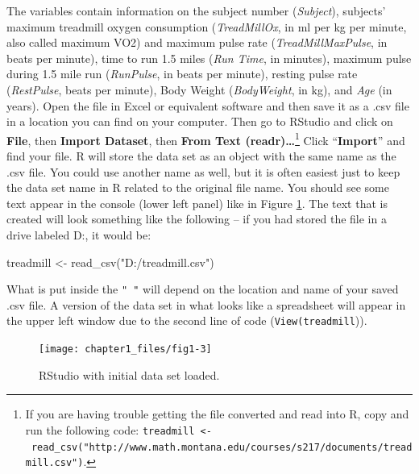 \documentclass[
]{book}
\newenvironment{Shaded}{\begin{snugshade}}{\end{snugshade}}
\newcommand{\FunctionTok}[1]{\textcolor[rgb]{0.00,0.00,0.00}{#1}}
\newcommand{\NormalTok}[1]{#1}
\newcommand{\OtherTok}[1]{\textcolor[rgb]{0.56,0.35,0.01}{#1}}
\newcommand{\StringTok}[1]{\textcolor[rgb]{0.31,0.60,0.02}{#1}}
\begin{document}
\indent The variables contain information on the subject number (\emph{Subject}), subjects'
maximum treadmill oxygen consumption (\emph{TreadMillOx}, in ml per kg per minute, also called maximum VO2) and
maximum pulse rate (\emph{TreadMillMaxPulse}, in beats per minute), time to run 1.5
miles (\emph{Run Time}, in minutes), maximum pulse
during 1.5 mile run (\emph{RunPulse}, in beats per minute), resting pulse rate
(\emph{RestPulse}, beats per minute), Body Weight (\emph{BodyWeight}, in kg), and \emph{Age}
(in years). Open the file in Excel or equivalent software and then save it as
a .csv file in a location you can find on your computer. Then go to RStudio
and click on \textbf{File}, then \textbf{Import Dataset}, then \textbf{From Text (readr)\ldots{}}\footnote{If
  you are having trouble getting the file converted and read into R, copy and
  run the following code:
  \texttt{treadmill\ \textless{}-\ read\_csv("http://www.math.montana.edu/courses/s217/documents/treadmill.csv")}.}
Click ``\textbf{Import}'' and find your file. R will store the data set as an object with the same name
as the .csv file. You could use another name as well, but it is
often easiest just to keep the data
set name in R related to the original file name. You should see some text appear
in the console (lower left panel) like in Figure \ref{fig:Figure1-3}. The text
that is created
will look something like the following -- if you had stored the file in a drive
labeled D:, it would be:

\begin{Shaded}
\begin{Highlighting}[]
\NormalTok{treadmill }\OtherTok{\textless{}{-}} \FunctionTok{read\_csv}\NormalTok{(}\StringTok{"D:/treadmill.csv"}\NormalTok{)}
\end{Highlighting}
\end{Shaded}

What is put inside the
\texttt{"\ "} will depend on the location and name of your saved .csv file. A
version of the data set in what looks like a
spreadsheet will appear in the upper left window due to the second line of
code (\texttt{View(treadmill})).



\begin{figure}[ht!]

{\centering \texttt{[image: chapter1\_files/fig1-3]} 

}

\caption{RStudio with initial data set loaded.}\label{fig:Figure1-3}
\end{figure}
\end{document}

